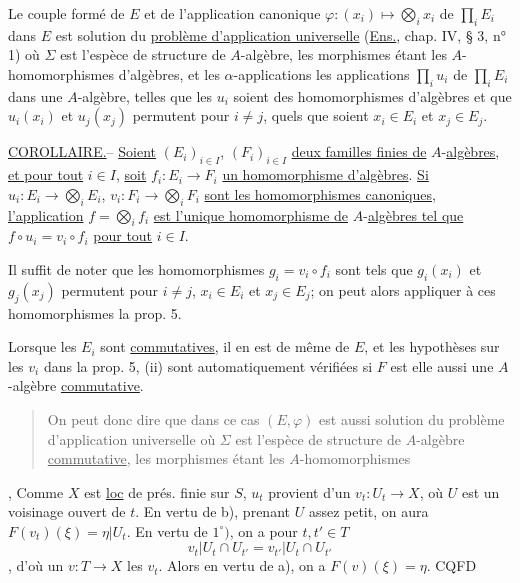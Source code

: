 Le couple formé de $E$ et de l'application canonique $\varphi:(x_i)\mapsto\bigotimes_i x_i$ de $\prod_i E_i$ dans $E$ est solution du \uline{problème d'application universelle} (\uline{Ens.}, chap. IV, § 3, n° 1) où $\Sigma$ est l'espèce de structure de $A$-algèbre, les morphismes étant les $A$-homomorphismes d'algèbres, et les $\alpha$-applications les applications $\prod_i u_i$ de $\prod_i E_i$ dans une $A$-algèbre, telles que les $u_i$ soient des homomorphismes d'algèbres et que $u_i(x_i)$ et $u_j(x_j)$ permutent pour $i\ne j$, quels que soient $x_i\in E_i$ et $x_j\in E_j$.

\uline{COROLLAIRE.}-- \uline{Soient} $(E_i)_{i\in I}$, $(F_i)_{i\in I}$ \uline{deux familles finies de} $A$-\uline{algèbres}, \uline{et pour tout} $i\in I$, \uline{soit} $f_i:E_i\to F_i$ \uline{un homomorphisme d'algèbres}. \uline{Si} $u_i:E_i\to\bigotimes_i E_i$, $v_i:F_i\to\bigotimes_i F_i$ \uline{sont les homomorphismes canoniques}, \uline{l'application} $f=\bigotimes_i f_i$ \uline{est l'unique homomorphisme de} $A$-\uline{algèbres tel que} $f\circ u_i=v_i\circ f_i$ \uline{pour tout} $i\in I$.

Il suffit de noter que les homomorphismes $g_i=v_i\circ f_i$ sont tels que $g_i(x_i)$ et $g_j(x_j)$ permutent pour $i\ne j$, $x_i\in E_i$ et $x_j\in E_j$; on peut alors appliquer à ces homomorphismes la prop. 5.

Lorsque les $E_i$ sont \uline{commutatives}, il en est de même de $E$, et les hypothèses sur les $v_i$ dans la prop. 5, (ii) sont automatiquement vérifiées si $F$ est elle aussi une $A$-algèbre \uline{commutative}.

\begin{quote}
On peut donc dire que dans ce cas $(E,\varphi)$ est aussi solution du problème d'application universelle où $\Sigma$ est l'espèce de structure de $A$-algèbre \uline{commutative}, les morphismes étant les $A$-homomorphismes
\end{quote}
, Comme $X$ est \uline{loc} de prés. finie sur $S$, $u_t$ provient d'un $v_t:U_t\to X$, où $U$ est un voisinage ouvert de $t$. En vertu de b), prenant $U$ assez petit, on aura $F(v_t)(\xi)=\eta|U_t$.
En vertu de $1^\circ)$, on a pour $t,t'\in T$
\[
v_t|U_t\cap U_{t'}=v_{t'}|U_t\cap U_{t'}
\]
, d'où un $v:T\to X$   les $v_t$.
Alors en vertu de a), on a $F(v)(\xi)=\eta$.
\hfill CQFD

